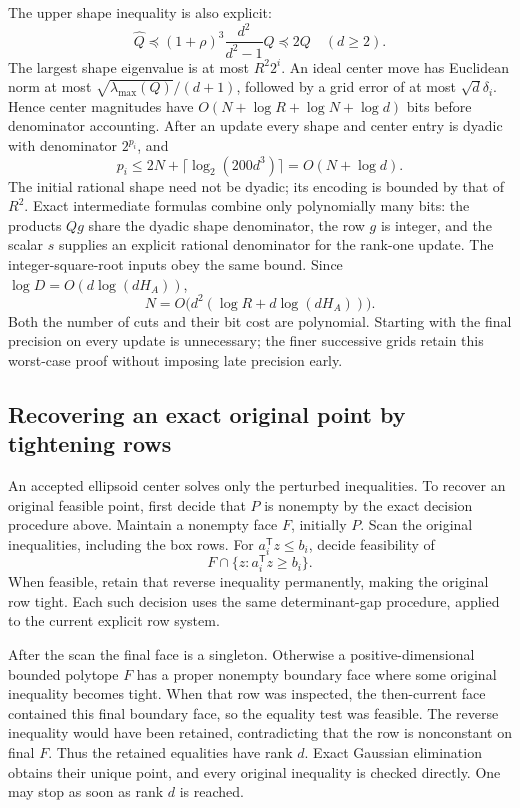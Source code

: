 The upper shape inequality is also explicit:
\[
 \widehat Q\preceq(1+\rho)^3\frac{d^2}{d^2-1}Q\preceq2Q
 \quad(d\ge2).
\]
The largest shape eigenvalue is at most $R^2 2^i$.  An ideal center move has
Euclidean norm at most $\sqrt{\lambda_{\max}(Q)}/(d+1)$, followed by a grid
error of at most $\sqrt d\delta_i$.  Hence center magnitudes have
$O(N+\log R+\log N+\log d)$ bits before denominator accounting.
After an update every shape and center entry is dyadic with denominator
$2^{p_i}$, and
\[
 p_i\le2N+\lceil\log_2(200d^3)\rceil=O(N+\log d).
\]
The initial rational shape need not be dyadic; its encoding is bounded by
that of $R^2$.  Exact intermediate formulas combine only polynomially many
bits: the products $Qg$ share the dyadic shape denominator, the row $g$ is
integer, and the scalar $s$ supplies an explicit rational denominator for
the rank-one update.  The integer-square-root inputs obey the same bound.
Since $\log D=O(d\log(dH_A))$,
\[
 N=O\bigl(d^2(\log R+d\log(dH_A))\bigr).
\]
Both the number of cuts and their bit cost are polynomial.  Starting with
the final precision on every update is unnecessary; the finer successive
grids retain this worst-case proof without imposing late precision early.

\subsection{Recovering an exact original point by tightening rows}

An accepted ellipsoid center solves only the perturbed inequalities.  To
recover an original feasible point, first decide that $P$ is nonempty by
the exact decision procedure above.  Maintain a nonempty face $F$, initially
$P$.  Scan the original inequalities, including the box rows.  For
$a_i^{\mathsf T}z\le b_i$, decide feasibility of
\[
 F\cap\{z:a_i^{\mathsf T}z\ge b_i\}.
\]
When feasible, retain that reverse inequality permanently, making the
original row tight.  Each such decision uses the same determinant-gap
procedure, applied to the current explicit row system.

After the scan the final face is a singleton.  Otherwise a positive-dimensional
bounded polytope $F$ has a proper nonempty boundary face where some original
inequality becomes tight.  When that row was inspected, the then-current
face contained this final boundary face, so the equality test was feasible.
The reverse inequality would have been retained, contradicting that the row
is nonconstant on final $F$.  Thus the retained equalities have rank $d$.
Exact Gaussian elimination obtains their unique point, and every original
inequality is checked directly.  One may stop as soon as rank $d$ is reached.

